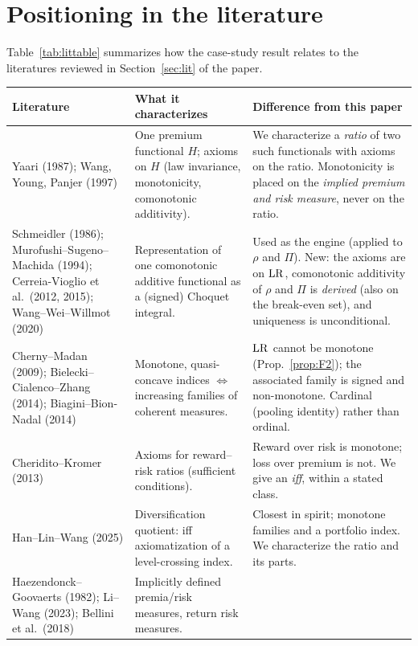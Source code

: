 \section{Positioning in the literature}\label{sec:lit-table}

Table~\ref{tab:littable} summarizes how the case-study result relates to the literatures reviewed in Section~\ref{sec:lit} of the paper.


\begin{table}[ht]
\centering\small
\begin{tabularx}{\textwidth}{@{}>{\raggedright\arraybackslash}p{3.1cm}>{\raggedright\arraybackslash}X>{\raggedright\arraybackslash}X@{}}
\toprule
\textbf{Literature} & \textbf{What it characterizes} & \textbf{Difference from this paper}\\
\midrule
Yaari (1987); Wang, Young, Panjer (1997)
 & One premium functional $H$; axioms on $H$ (law invariance, monotonicity, comonotonic additivity).
 & We characterize a \emph{ratio} of two such functionals with axioms on the ratio. Monotonicity is placed on the \emph{implied premium and risk measure}, never on the ratio.\\
Schmeidler (1986); Murofushi--Sugeno--Machida (1994); Cerreia-Vioglio et al.\ (2012, 2015); Wang--Wei--Willmot (2020)
 & Representation of one comonotonic additive functional as a (signed) Choquet integral.
 & Used as the engine (applied to $\rho$ and $\Pi$). New: the axioms are on $\mathrm{LR}$, comonotonic additivity of $\rho$ and $\Pi$ is \emph{derived} (also on the break-even set), and uniqueness is unconditional.\\
Cherny--Madan (2009); Bielecki--Cialenco--Zhang (2014); Biagini--Bion-Nadal (2014)
 & Monotone, quasi-concave indices $\Leftrightarrow$ increasing families of coherent measures.
 & $\mathrm{LR}$ cannot be monotone (Prop.~\ref{prop:F2}); the associated family is signed and non-monotone. Cardinal (pooling identity) rather than ordinal.\\
Cheridito--Kromer (2013)
 & Axioms for reward--risk ratios (sufficient conditions).
 & Reward over risk is monotone; loss over premium is not. We give an \emph{iff}, within a stated class.\\
Han--Lin--Wang (2025)
 & Diversification quotient: iff axiomatization of a level-crossing index.
 & Closest in spirit; monotone families and a portfolio index. We characterize the ratio and its parts.\\
Haezendonck--Goovaerts (1982); Li--Wang (2023); Bellini et al.\ (2018)
 & Implicitly defined premia/risk measures, return risk measures.

\end{tabularx}
\end{table}
